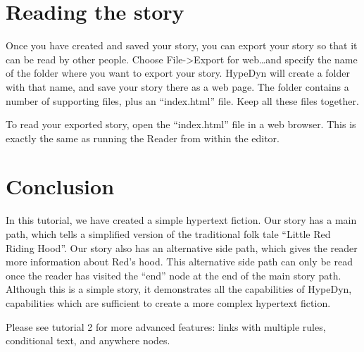 \documentclass{article}
\begin{document}
\section{Reading the story}

Once you have created and saved your story, you can export your story so that it
can be read by other people. Choose File->Export for web\ldots and specify the
name of the folder where you want to export your story. HypeDyn will create a
folder with that name, and save your story there as a web page. The folder
contains a number of supporting files, plus an ``index.html'' file. Keep all
these files together.

To read your exported story, open the ``index.html'' file in a web browser. This
is exactly the same as running the Reader from within the editor.

\section{Conclusion}

In this tutorial, we have created a simple hypertext fiction. Our story has a
main path, which tells a simplified version of the traditional folk tale
``Little Red Riding Hood''. Our story also has an alternative side path, which
gives the reader more information about Red's hood. This alternative side path
can only be read once the reader has visited the ``end'' node at the end of the
main story path. Although this is a simple story, it demonstrates all the
capabilities of HypeDyn, capabilities which are sufficient to create a more
complex hypertext fiction.



Please see tutorial 2 for more advanced features: links with multiple rules,
conditional text, and anywhere nodes.
\end{document}
